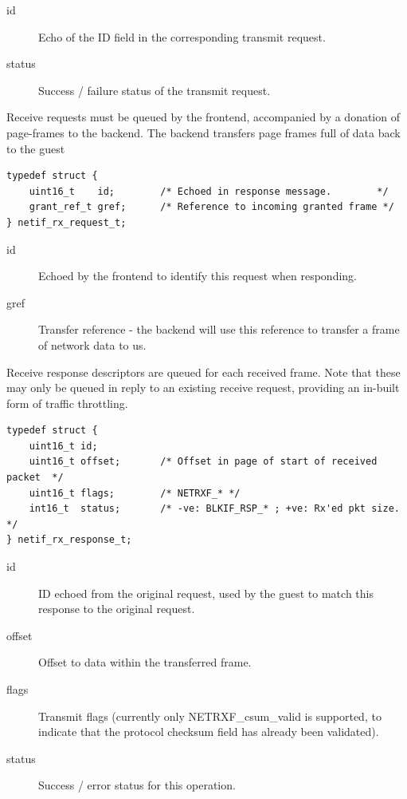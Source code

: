 \documentclass[11pt,twoside,final,openright]{report}
\begin{document}
\begin{description}
\item[id] Echo of the ID field in the corresponding transmit request.
\item[status] Success / failure status of the transmit request.
\end{description}

Receive requests must be queued by the frontend, accompanied by a
donation of page-frames to the backend.  The backend transfers page
frames full of data back to the guest

\scriptsize
\begin{verbatim}
typedef struct {
    uint16_t    id;        /* Echoed in response message.        */
    grant_ref_t gref;      /* Reference to incoming granted frame */
} netif_rx_request_t;
\end{verbatim}
\normalsize

\begin{description}
\item[id] Echoed by the frontend to identify this request when
  responding.
\item[gref] Transfer reference - the backend will use this reference
  to transfer a frame of network data to us.
\end{description}

Receive response descriptors are queued for each received frame.  Note
that these may only be queued in reply to an existing receive request,
providing an in-built form of traffic throttling.

\scriptsize
\begin{verbatim}
typedef struct {
    uint16_t id;
    uint16_t offset;       /* Offset in page of start of received packet  */
    uint16_t flags;        /* NETRXF_* */
    int16_t  status;       /* -ve: BLKIF_RSP_* ; +ve: Rx'ed pkt size. */
} netif_rx_response_t;
\end{verbatim}
\normalsize

\begin{description}
\item[id] ID echoed from the original request, used by the guest to
  match this response to the original request.
\item[offset] Offset to data within the transferred frame.
\item[flags] Transmit flags (currently only NETRXF\_csum\_valid is
  supported, to indicate that the protocol checksum field has already
  been validated).
\item[status] Success / error status for this operation.
\end{description}
\end{document}
